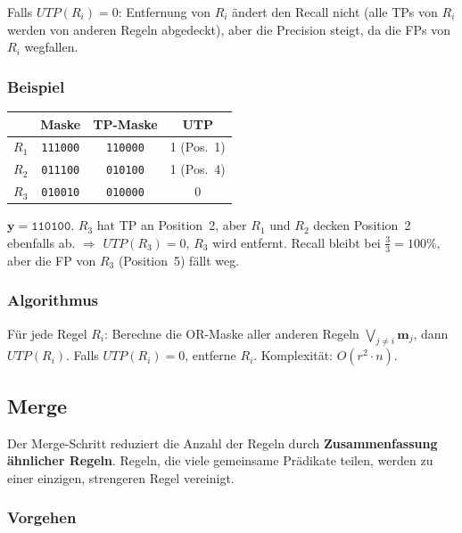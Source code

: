 \documentclass[11pt,a4paper]{article}
\begin{document}
\medskip
\noindent Falls $\mathit{UTP}(R_i) = 0$: Entfernung von $R_i$ \"andert den Recall nicht (alle TPs von $R_i$ werden von anderen Regeln abgedeckt), aber die Precision steigt, da die FPs von $R_i$ wegfallen.

\subsubsection{Beispiel}

\begin{center}
\renewcommand{\arraystretch}{1.2}
\begin{tabular}{lccc}
\toprule
& Maske & TP-Maske & UTP \\
\midrule
$R_1$ & \texttt{111000} & \texttt{110000} & 1 (Pos.~1) \\
$R_2$ & \texttt{011100} & \texttt{010100} & 1 (Pos.~4) \\
$R_3$ & \texttt{010010} & \texttt{010000} & 0 \\
\bottomrule
\end{tabular}
\end{center}

\noindent $\mathbf{y} = \texttt{110100}$. $R_3$ hat TP an Position~2, aber $R_1$ und $R_2$ decken Position~2 ebenfalls ab. $\Rightarrow$ $\mathit{UTP}(R_3) = 0$, $R_3$ wird entfernt. Recall bleibt bei $\frac{3}{3} = 100\%$, aber die FP von $R_3$ (Position~5) f\"allt weg.

\subsubsection{Algorithmus}

F\"ur jede Regel $R_i$: Berechne die OR-Maske aller anderen Regeln $\bigvee_{j \neq i} \mathbf{m}_j$, dann $\mathit{UTP}(R_i)$. Falls $\mathit{UTP}(R_i) = 0$, entferne $R_i$. Komplexit\"at: $O(r^2 \cdot n)$.

\subsection{Merge}

Der Merge-Schritt reduziert die Anzahl der Regeln durch \textbf{Zusammenfassung \"ahnlicher Regeln}. Regeln, die viele gemeinsame Pr\"adikate teilen, werden zu einer einzigen, strengeren Regel vereinigt.

\subsubsection{Vorgehen}
\end{document}
